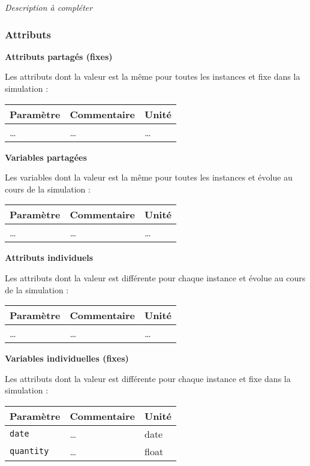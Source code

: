 \documentclass[
]{article}
\begin{document}
\emph{Description à compléter}

\subsubsection{Attributs}\label{attributs-16}

\textbf{Attributs partagés (fixes)}

Les attributs dont la valeur est la même pour toutes les instances et
fixe dans la simulation :

\begin{longtable}[]{@{}lll@{}}
\toprule\noalign{}
\textbf{Paramètre} & \textbf{Commentaire} & \textbf{Unité} \\
\midrule\noalign{}
\endhead
\bottomrule\noalign{}
\endlastfoot
\ldots{} & \ldots{} & \ldots{} \\
\end{longtable}

\textbf{Variables partagées}

Les variables dont la valeur est la même pour toutes les instances et
évolue au cours de la simulation :

\begin{longtable}[]{@{}lll@{}}
\toprule\noalign{}
\textbf{Paramètre} & \textbf{Commentaire} & \textbf{Unité} \\
\midrule\noalign{}
\endhead
\bottomrule\noalign{}
\endlastfoot
\ldots{} & \ldots{} & \ldots{} \\
\end{longtable}

\textbf{Attributs individuels}

Les attributs dont la valeur est différente pour chaque instance et
évolue au cours de la simulation :

\begin{longtable}[]{@{}lll@{}}
\toprule\noalign{}
\textbf{Paramètre} & \textbf{Commentaire} & \textbf{Unité} \\
\midrule\noalign{}
\endhead
\bottomrule\noalign{}
\endlastfoot
\ldots{} & \ldots{} & \ldots{} \\
\end{longtable}

\textbf{Variables individuelles (fixes)}

Les attributs dont la valeur est différente pour chaque instance et fixe
dans la simulation :

\begin{longtable}[]{@{}lll@{}}
\toprule\noalign{}
\textbf{Paramètre} & \textbf{Commentaire} & \textbf{Unité} \\
\midrule\noalign{}
\endhead
\bottomrule\noalign{}
\endlastfoot
\texttt{date} & \ldots{} & date \\
\texttt{quantity} & \ldots{} & float \\
\end{longtable}
\end{document}
